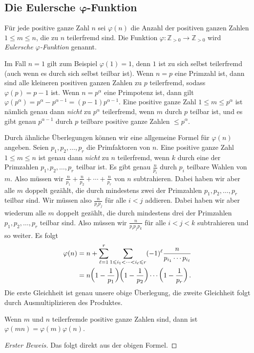\subsection*{Die Eulersche $\boldsymbol{\varphi}$-Funktion}
\begin{definition}
	Für jede positive ganze Zahl $n$ sei $\varphi(n)$ die Anzahl der positiven ganzen Zahlen $1\leqslant m\leqslant n$, die zu $n$ teilerfremd sind. Die Funktion $\varphi\colon \mathbb Z_{>0}\rightarrow \mathbb Z_{>0}$ wird \emph{Eulersche $\varphi$-Funktion} genannt.
\end{definition}
Im Fall $n=1$ gilt zum Beispiel $\varphi(1)=1$, denn $1$ ist zu sich selbst teilerfremd (auch wenn es durch sich selbst teilbar ist). Wenn $n=p$ eine Primzahl ist, dann sind alle kleineren positiven ganzen Zahlen zu $p$ teilerfremd, sodass $\varphi(p)=p-1$ ist. Wenn $n=p^\alpha$ eine Primpotenz ist, dann gilt $\varphi(p^\alpha)=p^\alpha-p^{\alpha-1}=(p-1)p^{\alpha-1}$. Eine positive ganze Zahl $1\leqslant m\leqslant p^\alpha$ ist nämlich genau dann \emph{nicht} zu $p^\alpha$ teilerfremd, wenn $m$ durch $p$ teilbar ist, und es gibt genau $p^{\alpha-1}$ durch $p$ teilbare positive ganze Zahlen $\leqslant p^\alpha$.

Durch ähnliche Überlegungen können wir eine allgemeine Formel für $\varphi(n)$ angeben. Seien $p_1,p_2,\dotsc,p_r$ die Primfaktoren von $n$. Eine positive ganze Zahl $1\leqslant m\leqslant n$ ist genau dann \emph{nicht} zu $n$ teilerfremd, wenn $k$ durch eine der Primzahlen $p_1,p_2,\dotsc,p_r$ teilbar ist. Es gibt genau $\frac{n}{p_i}$ durch $p_i$ teilbare Wahlen von $m$. Also müssen wir $\frac{n}{p_1}+\frac{n}{p_2}+\dotsb+\frac{n}{p_r}$ von $n$ subtrahieren. Dabei haben wir aber alle $m$ doppelt gezählt, die durch mindestens zwei der Primzahlen $p_1,p_2,\dotsc,p_r$ teilbar sind. Wir müssen also $\frac{n}{p_ip_j}$ für alle $i<j$ addieren. Dabei haben wir aber wiederum alle $m$ doppelt gezählt, die durch mindestens drei der Primzahlen $p_1,p_2,\dotsc,p_r$ teilbar sind. Also müssen wir $\frac{n}{p_ip_jp_k}$ für alle $i<j<k$ subtrahieren und so weiter. Es folgt
\begin{align*}
	\varphi(n)&=n+\sum_{\ell=1}^r\sum_{1\leqslant i_1<\dotsb<i_\ell\leqslant r}(-1)^\ell\frac{n}{p_{i_1}\dotsm p_{i_\ell}}\\
	&=n\parens*{1-\frac 1{p_1}}\parens*{1-\frac 1{p_2}}\dotsm \parens*{1-\frac 1{p_r}}\,.
\end{align*}
Die erste Gleichheit ist genau unsere obige Überlegung, die zweite Gleichheit folgt durch Ausmultiplizieren des Produktes.
\begin{satzmitnamen}[Lemma]
	Wenn $m$ und $n$ teilerfremde positive ganze Zahlen sind, dann ist $\varphi(mn)=\varphi(m)\varphi(n)$.
\end{satzmitnamen}
\begin{proof}[Erster Beweis]
	Das folgt direkt aus der obigen Formel.
\end{proof}

